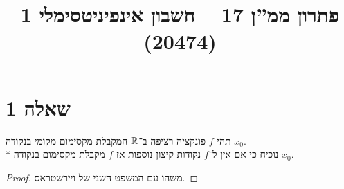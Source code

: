 
\title{פתרון ממ''ן 17 – חשבון אינפיניטסימלי 1 (20474)}


\maketitle
\section{שאלה 1}
תהי $f$ פונקציה רציפה ב־$\mathbb{R}$ המקבלת מקסימום מקומי בנקודה $x_0$. \\*
נוכיח כי אם אין ל־$f$ נקודות קיצון נוספות אז $f$ מקבלת מקסימום בנקודה $x_0$.
\begin{proof}
	משהו עם המשפט השני של ויירשטראס.
\end{proof}



